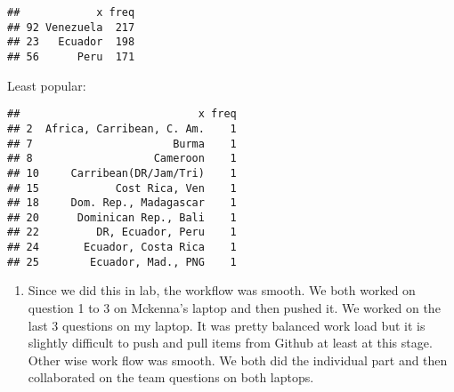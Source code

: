 \documentclass[]{article}
\newenvironment{Shaded}{\begin{snugshade}}{\end{snugshade}}
\newcommand{\DecValTok}[1]{\textcolor[rgb]{0.00,0.00,0.81}{#1}}
\newcommand{\KeywordTok}[1]{\textcolor[rgb]{0.13,0.29,0.53}{\textbf{#1}}}
\newcommand{\NormalTok}[1]{#1}
\newcommand{\OperatorTok}[1]{\textcolor[rgb]{0.81,0.36,0.00}{\textbf{#1}}}
\newcommand{\StringTok}[1]{\textcolor[rgb]{0.31,0.60,0.02}{#1}}
\providecommand{\tightlist}{%
  \setlength{\itemsep}{0pt}\setlength{\parskip}{0pt}}
\begin{document}
\begin{Shaded}
\end{Shaded}

\begin{verbatim}
##            x freq
## 92 Venezuela  217
## 23   Ecuador  198
## 56      Peru  171
\end{verbatim}

Least popular:

\begin{Shaded}
\end{Shaded}

\begin{verbatim}
##                            x freq
## 2  Africa, Carribean, C. Am.    1
## 7                      Burma    1
## 8                   Cameroon    1
## 10     Carribean(DR/Jam/Tri)    1
## 15            Cost Rica, Ven    1
## 18     Dom. Rep., Madagascar    1
## 20      Dominican Rep., Bali    1
## 22         DR, Ecuador, Peru    1
## 24       Ecuador, Costa Rica    1
## 25        Ecuador, Mad., PNG    1
\end{verbatim}

\begin{enumerate}
\def\labelenumi{\arabic{enumi})}
\setcounter{enumi}{5}
\tightlist
\item
  Since we did this in lab, the workflow was smooth. We both worked on
  question 1 to 3 on Mckenna's laptop and then pushed it. We worked on
  the last 3 questions on my laptop. It was pretty balanced work load
  but it is slightly difficult to push and pull items from Github at
  least at this stage. Other wise work flow was smooth. We both did the
  individual part and then collaborated on the team questions on both
  laptops.
\end{enumerate}
\end{document}
